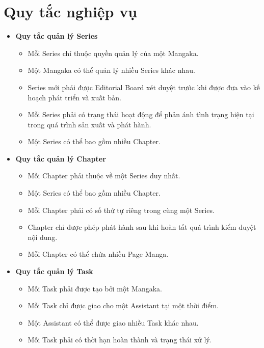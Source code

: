 

\section{Quy tắc nghiệp vụ}
\label{sec:quy_tac_nghiep_vu}

\begin{itemize}
    \item \textbf{Quy tắc quản lý Series}
    \begin{itemize}
        \item Mỗi Series chỉ thuộc quyền quản lý của một Mangaka.
        \item Một Mangaka có thể quản lý nhiều Series khác nhau.
        \item Series mới phải được Editorial Board xét duyệt trước khi được đưa vào kế hoạch phát triển và xuất bản.
        \item Mỗi Series phải có trạng thái hoạt động để phản ánh tình trạng hiện tại trong quá trình sản xuất và phát hành.
        \item Một Series có thể bao gồm nhiều Chapter.
    \end{itemize}
    \item \textbf{Quy tắc quản lý Chapter}
    \begin{itemize}
        \item Mỗi Chapter phải thuộc về một Series duy nhất.
        \item Một Series có thể bao gồm nhiều Chapter.
        \item Mỗi Chapter phải có số thứ tự riêng trong cùng một Series.
        \item Chapter chỉ được phép phát hành sau khi hoàn tất quá trình kiểm duyệt nội dung.
        \item Mỗi Chapter có thể chứa nhiều Page Manga.
    \end{itemize}
    \item \textbf{Quy tắc quản lý Task}
    \begin{itemize}
        \item Mỗi Task phải được tạo bởi một Mangaka.
        \item Mỗi Task chỉ được giao cho một Assistant tại một thời điểm.
        \item Một Assistant có thể được giao nhiều Task khác nhau.
        \item Mỗi Task phải có thời hạn hoàn thành và trạng thái xử lý.

\end{itemize}
\end{itemize}
